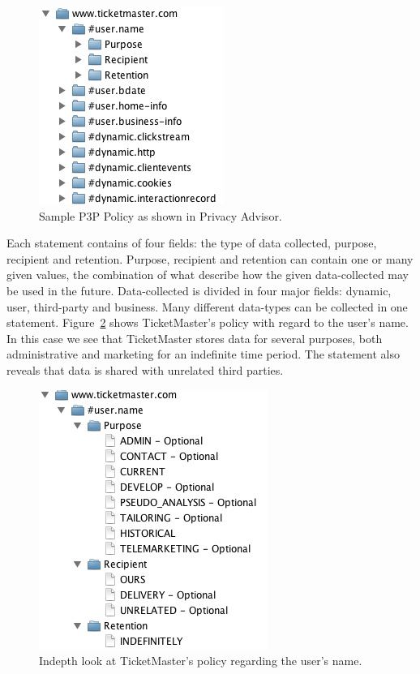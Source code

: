 \begin{figure}[htbp]
\begin{center}
\includegraphics{Implementation/p3p_pol}
\caption{Sample P3P Policy as shown in Privacy Advisor.}
\label{p3pPol}
\end{center}
\end{figure}

Each statement contains of four fields: the type of data collected, purpose, recipient and retention. Purpose, recipient and retention can contain one or many given values, the combination of what describe how the given data-collected may be used in the future. Data-collected is divided in four major fields: dynamic, user, third-party and business. Many different data-types can be collected in one statement. Figure~\ref{p3pNameField} shows TicketMaster's policy with regard to the user's name. In this case we see that TicketMaster stores data for several purposes, both administrative and marketing for an indefinite time period. The statement also reveals that data is shared with unrelated third parties.

\begin{figure}[htbp]
\begin{center}
\includegraphics{Implementation/p3p_fields}
\caption{Indepth look at TicketMaster's policy regarding the user's name.}
\label{p3pNameField}
\end{center}
\end{figure}


